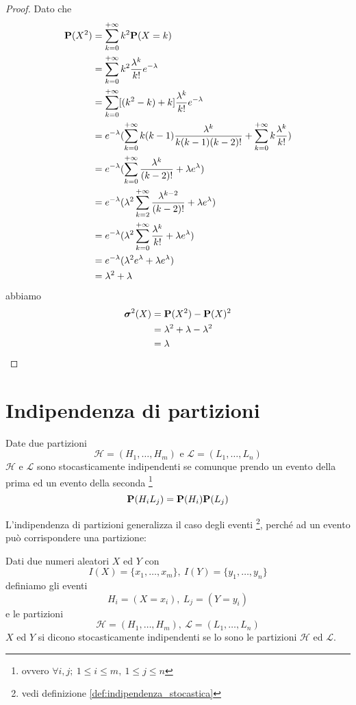 \begin{proof}
  Dato che
  \begin{align*}
    \mathbf{P}(X^2) &= \sum_{k=0}^{+ \infty} k^2 \mathbf{P}(X = k) \\
    &= \sum_{k=0}^{+ \infty} k^2 \frac{\lambda^k}{k!} e^{- \lambda} \\
    &= \sum_{k=0}^{+ \infty} [(k^2 - k) + k] \frac{\lambda^k}{k!} e^{- \lambda} \\
    &= e^{- \lambda} (\sum_{k=0}^{+ \infty} k(k - 1) \frac{\lambda^k}{k(k-1)(k-2)!} + \sum_{k=0}^{+ \infty} k \frac{\lambda^k}{k!}) \\
    &= e^{- \lambda} (\sum_{k=0}^{+ \infty} \frac{\lambda^k}{(k-2)!} + \lambda e^\lambda) \\
    &= e^{- \lambda} (\lambda^2 \sum_{k=2}^{+ \infty} \frac{\lambda^{k-2}}{(k-2)!} + \lambda e^\lambda) \\
    &= e^{- \lambda} (\lambda^2 \sum_{k=0}^{+ \infty} \frac{\lambda^k}{k!} + \lambda e^\lambda) \\
    &= e^{- \lambda} (\lambda^2 e^\lambda + \lambda e^\lambda) \\
    &= \lambda^2 + \lambda
  \end{align*}
  abbiamo
  \begin{align*}
    \boldsymbol\sigma^2(X) &= \mathbf{P}(X^2) - \mathbf{P}(X)^2 \\
    &= \lambda^2 + \lambda - \lambda^2 \\
    &= \lambda
  \end{align*}
\end{proof}


\section{Indipendenza di partizioni} %
\begin{definition}
  \label{def:indipendenza_di_partizioni}
  Date due partizioni
  \[ \mathcal{H} = (H_1, \ldots, H_m) \text{ e } \mathcal{L} = (L_1, \ldots, L_n) \]
  \( \mathcal{H} \) e \( \mathcal{L} \) sono stocasticamente indipendenti se comunque prendo un evento della prima ed un evento della seconda
  \footnote{ovvero \( \forall i, j; ~ 1 \le i \le m, ~ 1 \le j \le n \)}
  \[ \mathbf{P}(H_i L_j) = \mathbf{P}(H_i) \mathbf{P}(L_j) \]
\end{definition}

L'indipendenza di partizioni generalizza il caso degli eventi
\footnote{vedi definizione \ref{def:indipendenza_stocastica}},
perché ad un evento può corrispondere una partizione:
\begin{definition}
  Dati due numeri aleatori \( X \) ed \( Y \) con
  \[ I(X) = \{ x_1, \ldots, x_m \}, ~ I(Y) = \{ y_1, \ldots, y_n \} \]
  definiamo gli eventi
  \[ H_i = (X = x_i), ~ L_j = (Y = y_i) \]
  e le partizioni
  \[ \mathcal{H} = (H_1, \ldots, H_m), ~ \mathcal{L} = (L_1, \ldots, L_n) \]
  \( X \) ed \( Y \) si dicono stocasticamente indipendenti se lo sono le partizioni \( \mathcal{H} \) ed \( \mathcal{L} \).
\end{definition}
